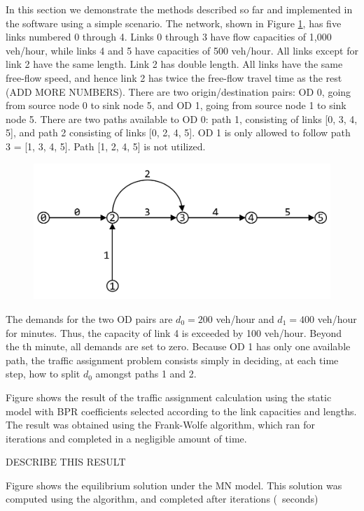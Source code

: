 In this section we demonstrate the methods described so far and implemented in the software using a simple scenario. The network, shown in Figure \ref{fig:config}, has five links numbered 0 through 4. Links 0 through 3 have flow capacities of 1,000 veh/hour, while links 4 and 5 have capacities of 500 veh/hour. All links except for link 2 have the same length. Link 2 has double length. All links have the same free-flow speed, and hence link 2 has twice the free-flow travel time as the rest (ADD MORE NUMBERS). There are two origin/destination pairs: OD 0, going from source node 0 to sink node 5, and OD 1, going from source node 1 to sink node 5. There are two paths available to OD 0: path 1, consisting of links [0, 3, 4, 5], and path 2 consisting of links [0, 2, 4, 5]. OD 1 is only allowed to follow path 3 = [1, 3, 4, 5]. Path [1, 2, 4, 5] is not utilized.

\begin{figure}[h]
    \centering
    \includegraphics[width=\linewidth]{figs/config.png}
    \caption{\XXX}
    \label{fig:config}
\end{figure}


The demands for the two OD pairs are $d_0 = 200$ veh/hour and $d_1=400$ veh/hour for \XXX minutes. Thus, the capacity of link 4 is exceeded by 100 veh/hour. Beyond the \XXX th minute, all demands are set to zero. Because OD 1 has only one available path, the traffic assignment problem consists simply in deciding, at each time step, how to split $d_0$ amongst paths 1 and 2. 

Figure \XXX shows the result of the traffic assignment calculation using the static model with BPR coefficients selected according to the link capacities and lengths. The result was obtained using the Frank-Wolfe algorithm, which ran for \XXX iterations and completed in a negligible amount of time. 

DESCRIBE THIS RESULT

Figure \XXX shows the equilibrium solution under the MN model. This solution was computed using the \XXX algorithm, and completed after \XXX iterations (~\XXX seconds)

